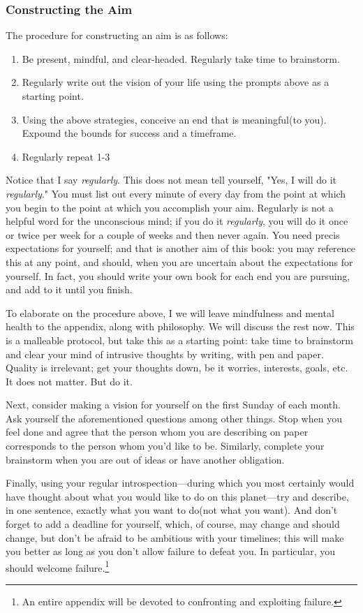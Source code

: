 \documentclass{book}
\numberwithin{equation}{section}
\begin{document}
\subsubsection{Constructing the Aim}
The procedure for constructing an aim is as follows:
\begin{enumerate}
    \item Be present, mindful, and clear-headed. Regularly take time to brainstorm.
    \item Regularly write out the vision of your life using the prompts above as a starting point.
    \item Using the above strategies, conceive an end that is meaningful(to you). Expound the bounds for success and a timeframe.
    \item Regularly repeat 1-3
\end{enumerate}
Notice that I say \emph{regularly}. This does not mean tell yourself, "Yes, I will do it \emph{regularly}." You must list out every minute of every day from the point at which you begin to the point at which you accomplish your aim. Regularly is not a helpful word for the unconscious mind; if you do it \emph{regularly}, you will do it once or twice per week for a couple of weeks and then never again. You need precis expectations for yourself; and that is another aim of this book: you may reference this at any point, and should, when  you are uncertain about the expectations for yourself. In fact, you should write your own book for each end you are pursuing, and add to it until you finish.

To elaborate on the procedure above, I we will leave mindfulness and mental health to the appendix, along with philosophy. We will discuss the rest now. This is a malleable protocol, but take this as a starting point: take time to brainstorm and clear your mind of intrusive thoughts by writing, with pen and paper. Quality is irrelevant; get your thoughts down, be it worries, interests, goals, etc. It does not matter. But do it. 

Next, consider making a vision for yourself on the first Sunday of each month. Ask yourself the aforementioned questions among other things. Stop when you feel done and agree that the person whom you are describing on paper corresponds to the person whom you'd like to be. Similarly, complete your brainstorm when you are out of ideas or have another obligation.

Finally, using your regular introspection---during which you most certainly would have thought about what you would like to do on this planet---try and describe, in one sentence, exactly what you want to do(not what you want). And don't forget to add a deadline for yourself, which, of course, may change and should change, but don't be afraid to be ambitious with your timelines; this will make you better as long as you don't allow failure to defeat you. In particular, you should welcome failure.\footnote{An entire appendix will be devoted to confronting and exploiting failure.}
\end{document}
